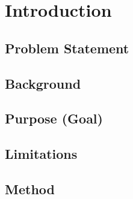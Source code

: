 \section{Introduction} \label{sec:Introduction}

\subsection{Problem Statement}

\subsection{Background}

\subsection{Purpose (Goal)}

\subsection{Limitations}

\subsection{Method}


